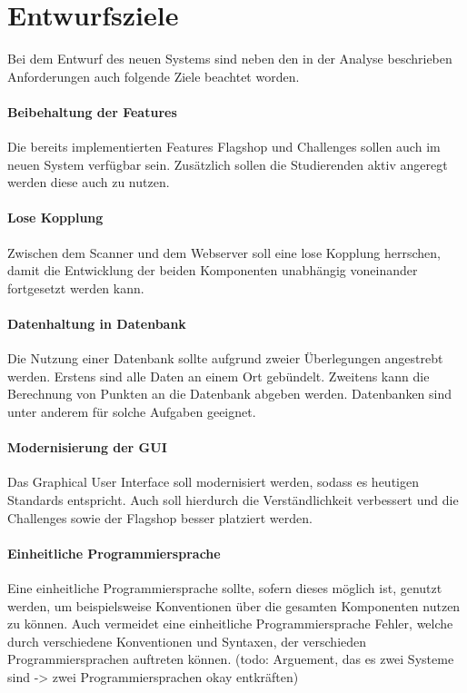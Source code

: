 \section{Entwurfsziele} \label{sec:Entwurfsziele}

Bei dem Entwurf des neuen Systems sind neben den in der Analyse beschrieben Anforderungen auch folgende Ziele beachtet worden.

\paragraph{Beibehaltung der Features}
Die bereits implementierten Features Flagshop und Challenges sollen auch im neuen System verfügbar sein. Zusätzlich sollen die Studierenden aktiv angeregt werden diese auch zu nutzen.

\paragraph{Lose Kopplung}
Zwischen dem Scanner und dem Webserver soll eine lose Kopplung herrschen, damit die Entwicklung der beiden Komponenten unabhängig voneinander fortgesetzt werden kann.

\paragraph{Datenhaltung in Datenbank}
Die Nutzung einer Datenbank sollte aufgrund zweier Überlegungen angestrebt werden. Erstens sind alle Daten an einem Ort gebündelt. Zweitens kann die Berechnung von Punkten an die Datenbank abgeben werden. Datenbanken sind unter anderem für solche Aufgaben geeignet.

\paragraph{Modernisierung der GUI}
Das Graphical User Interface soll modernisiert werden, sodass es heutigen Standards entspricht. Auch soll hierdurch die Verständlichkeit verbessert und die Challenges sowie der Flagshop besser platziert werden.

\paragraph{Einheitliche Programmiersprache}
Eine einheitliche Programmiersprache sollte, sofern dieses möglich ist, genutzt werden, um beispielsweise Konventionen über die gesamten Komponenten nutzen zu können. Auch vermeidet eine einheitliche Programmiersprache Fehler, welche durch verschiedene Konventionen und Syntaxen, der verschieden Programmiersprachen auftreten können. (todo: Arguement, das es zwei Systeme sind -> zwei Programmiersprachen okay entkräften)

